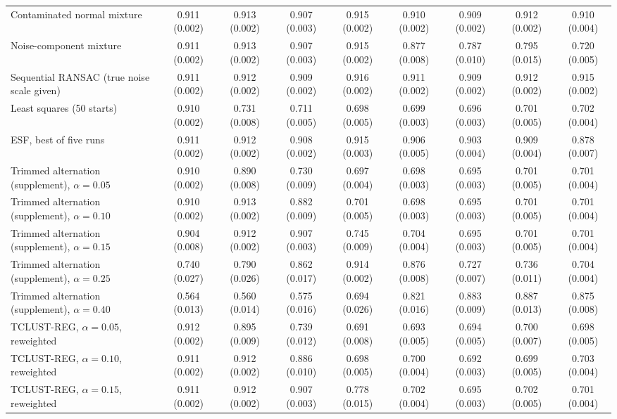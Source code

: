 \begin{table}[htbp]
{\begin{tabular}{lcccccccc}
Contaminated normal mixture & 0.911 (0.002) & 0.913 (0.002) & 0.907 (0.003) & 0.915 (0.002) & 0.910 (0.002) & 0.909 (0.002) & 0.912 (0.002) & 0.910 (0.004) \\
Noise-component mixture & 0.911 (0.002) & 0.913 (0.002) & 0.907 (0.003) & 0.915 (0.002) & 0.877 (0.008) & 0.787 (0.010) & 0.795 (0.015) & 0.720 (0.005) \\
Sequential RANSAC (true noise scale given) & 0.911 (0.002) & 0.912 (0.002) & 0.909 (0.002) & 0.916 (0.002) & 0.911 (0.002) & 0.909 (0.002) & 0.912 (0.002) & 0.915 (0.002) \\
Least squares (50 starts) & 0.910 (0.002) & 0.731 (0.008) & 0.711 (0.005) & 0.698 (0.005) & 0.699 (0.003) & 0.696 (0.003) & 0.701 (0.005) & 0.702 (0.004) \\
ESF, best of five runs & 0.911 (0.002) & 0.912 (0.002) & 0.908 (0.002) & 0.915 (0.003) & 0.906 (0.005) & 0.903 (0.004) & 0.909 (0.004) & 0.878 (0.007) \\
Trimmed alternation (supplement), $\alpha=0.05$ & 0.910 (0.002) & 0.890 (0.008) & 0.730 (0.009) & 0.697 (0.004) & 0.698 (0.003) & 0.695 (0.003) & 0.701 (0.005) & 0.701 (0.004) \\
Trimmed alternation (supplement), $\alpha=0.10$ & 0.910 (0.002) & 0.913 (0.002) & 0.882 (0.009) & 0.701 (0.005) & 0.698 (0.003) & 0.695 (0.003) & 0.701 (0.005) & 0.701 (0.004) \\
Trimmed alternation (supplement), $\alpha=0.15$ & 0.904 (0.008) & 0.912 (0.002) & 0.907 (0.003) & 0.745 (0.009) & 0.704 (0.004) & 0.695 (0.003) & 0.701 (0.005) & 0.701 (0.004) \\
Trimmed alternation (supplement), $\alpha=0.25$ & 0.740 (0.027) & 0.790 (0.026) & 0.862 (0.017) & 0.914 (0.002) & 0.876 (0.008) & 0.727 (0.007) & 0.736 (0.011) & 0.704 (0.004) \\
Trimmed alternation (supplement), $\alpha=0.40$ & 0.564 (0.013) & 0.560 (0.014) & 0.575 (0.016) & 0.694 (0.026) & 0.821 (0.016) & 0.883 (0.009) & 0.887 (0.013) & 0.875 (0.008) \\
TCLUST-REG, $\alpha=0.05$, reweighted & 0.912 (0.002) & 0.895 (0.009) & 0.739 (0.012) & 0.691 (0.008) & 0.693 (0.005) & 0.694 (0.005) & 0.700 (0.007) & 0.698 (0.005) \\
TCLUST-REG, $\alpha=0.10$, reweighted & 0.911 (0.002) & 0.912 (0.002) & 0.886 (0.010) & 0.698 (0.005) & 0.700 (0.004) & 0.692 (0.003) & 0.699 (0.005) & 0.703 (0.004) \\
TCLUST-REG, $\alpha=0.15$, reweighted & 0.911 (0.002) & 0.912 (0.002) & 0.907 (0.003) & 0.778 (0.015) & 0.702 (0.004) & 0.695 (0.003) & 0.702 (0.005) & 0.701 (0.004) \\
\bottomrule
\end{tabular}}
\end{table}

